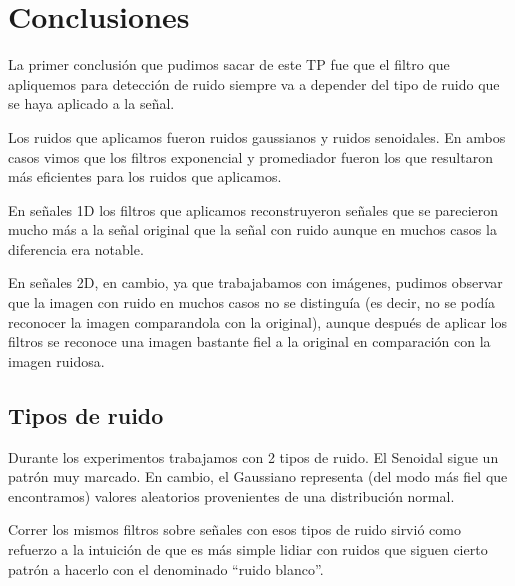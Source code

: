 \section{Conclusiones}

La primer conclusi\'on que pudimos sacar de este TP fue que el filtro que apliquemos para detecci\'on de ruido
siempre va a depender del tipo de ruido que se haya aplicado a la se\~nal.

Los ruidos que aplicamos fueron ruidos gaussianos y ruidos senoidales. En ambos casos vimos que los filtros
exponencial y promediador fueron los que resultaron m\'as eficientes para los ruidos que aplicamos.

En se\~nales 1D los filtros que aplicamos reconstruyeron se\~nales que se parecieron mucho m\'as a la se\~nal
original que la se\~nal con ruido aunque en muchos casos la diferencia era notable.

En se\~nales 2D, en cambio, ya que trabajabamos con im\'agenes, pudimos observar que la imagen con ruido en muchos
casos no se distingu\'ia (es decir, no se pod\'ia reconocer la imagen comparandola con la original), aunque despu\'es
de aplicar los filtros se reconoce una imagen bastante fiel a la original en comparaci\'on con la imagen ruidosa.

\subsection{Tipos de ruido}

Durante los experimentos trabajamos con 2 tipos de ruido. El Senoidal sigue un
patr\'on muy marcado. En cambio, el Gaussiano representa (del modo m\'as fiel
que encontramos) valores aleatorios provenientes de una distribuci\'on normal.

Correr los mismos filtros sobre se\~nales con esos tipos de ruido sirvi\'o como
refuerzo a la intuici\'on de que es m\'as simple lidiar con ruidos que siguen
cierto patr\'on a hacerlo con el denominado ``ruido blanco''.
